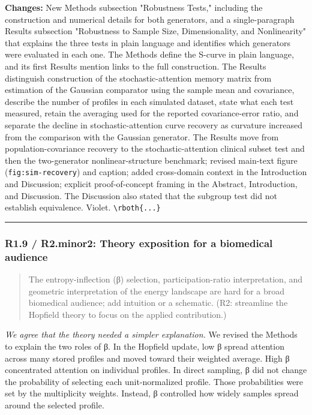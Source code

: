 \documentclass[
  11pt,
  letterpaper,
]{article}
\begin{document}
\textbf{Changes:} New Methods subsection "Robustness Tests," including the construction and numerical details for both generators, and a single-paragraph Results subsection "Robustness to Sample Size, Dimensionality, and Nonlinearity" that explains the three tests in plain language and identifies which generators were evaluated in each one. The Methods define the S-curve in plain language, and its first Results mention links to the full construction. The Results distinguish construction of the stochastic-attention memory matrix from estimation of the Gaussian comparator using the sample mean and covariance, describe the number of profiles in each simulated dataset, state what each test measured, retain the averaging used for the reported covariance-error ratio, and separate the decline in stochastic-attention curve recovery as curvature increased from the comparison with the Gaussian generator. The Results move from population-covariance recovery to the stochastic-attention clinical subset test and then the two-generator nonlinear-structure benchmark; revised main-text figure (\texttt{fig:sim-recovery}) and caption; added cross-domain context in the Introduction and Discussion; explicit proof-of-concept framing in the Abstract, Introduction, and Discussion. The Discussion also stated that the subgroup test did not establish equivalence. Violet. \texttt{\textbackslash{}rboth\{...\}}

\begin{center}\rule{0.5\linewidth}{0.5pt}\end{center}

\subsubsection{R1.9 / R2.minor2: Theory exposition for a biomedical audience}\label{r19--r2minor2-theory-exposition-for-a-biomedical-audience}

\begin{quote}
The entropy-inflection (β) selection, participation-ratio interpretation, and geometric interpretation of the energy landscape are hard for a broad biomedical audience; add intuition or a schematic. (R2: streamline the Hopfield theory to focus on the applied contribution.)
\end{quote}

\emph{We agree that the theory needed a simpler explanation.} We revised the Methods to explain the two roles of β. In the Hopfield update, low β spread attention across many stored profiles and moved toward their weighted average. High β concentrated attention on individual profiles. In direct sampling, β did not change the probability of selecting each unit-normalized profile. Those probabilities were set by the multiplicity weights. Instead, β controlled how widely samples spread around the selected profile.
\end{document}

